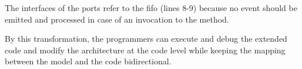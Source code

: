 \begin{minipage}{0.95\columnwidth}
	
\end{minipage}

The interfaces of the  ports refer to the fifo (lines 8-9) because no event should be emitted and processed in case of an invocation to the  method.  

By this transformation, the programmers can execute and debug the extended code and modify the architecture at the code level while keeping the mapping between the model and the code bidirectional.






